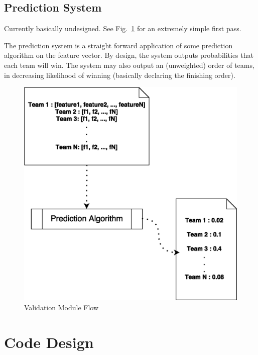 \documentclass[10pt, twoside]{article}
\begin{document}
\subsection{Prediction System}
\label{section:PS}
Currently basically undesigned. See Fig.~\ref{fig:prediction_module} for an 
extremely simple first pass.

The prediction system is a straight forward application of some prediction algorithm
on the feature vector. By design, the system outputs probabilities that each
team will win. The system may also output an (unweighted) order of teams, in
decreasing likelihood of winning (basically declaring the finishing order).

\begin{figure}[H]
  \centering
  \includegraphics[width=\textwidth]{PredictionModule}
  \caption{Validation Module Flow}
  \label{fig:prediction_module}
\end{figure}

\section{Code Design}
\end{document}
